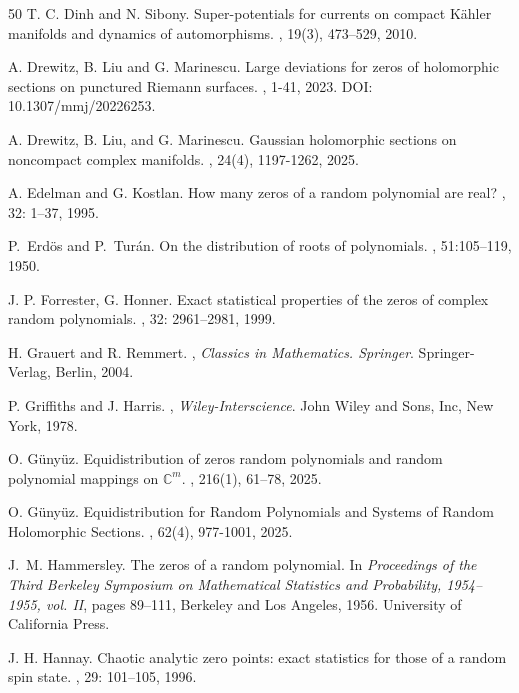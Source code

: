 \documentclass[11pt,leqno,oneside]{amsart}
\numberwithin{equation}{section}
\begin{document}
\begin{thebibliography}{50}
T. C. Dinh and N. Sibony.
\newblock Super-potentials for currents on compact K\"ahler manifolds and dynamics of automorphisms.
, 19(3), 473--529, 2010.

A. Drewitz, B. Liu and G. Marinescu.
\newblock Large deviations for zeros of holomorphic sections on punctured Riemann surfaces.
, 1-41, 2023. DOI: 10.1307/mmj/20226253.

A. Drewitz, B. Liu, and G. Marinescu.
\newblock Gaussian holomorphic sections on noncompact complex manifolds.
, 24(4), 1197-1262, 2025.

A. Edelman and G. Kostlan.
\newblock How many zeros of a random polynomial are real?
, 32: 1--37, 1995.

P.~Erd{\"o}s and P.~Tur{\'a}n.
\newblock On the distribution of roots of polynomials.
, 51:105--119, 1950.

J. P. Forrester, G. Honner.
\newblock Exact statistical properties of the zeros of complex random polynomials.
, 32: 2961–2981, 1999.

H. Grauert and R. Remmert.
, {\em Classics in Mathematics. Springer}.
\newblock Springer-Verlag, Berlin, 2004.

P. Griffiths and J. Harris.
, {\em Wiley-Interscience}.
\newblock John Wiley and Sons, Inc, New York, 1978.

O. Günyüz.
\newblock Equidistribution of zeros random polynomials and random polynomial mappings on $\mathbb{C}^m$.
, 216(1), 61–78, 2025.

O. Günyüz.
\newblock Equidistribution for Random Polynomials and Systems of Random Holomorphic Sections.
, 62(4), 977-1001, 2025.

J.~M. Hammersley.
\newblock The zeros of a random polynomial.
\newblock In {\em Proceedings of the {T}hird {B}erkeley {S}ymposium on {M}athematical {S}tatistics and {P}robability, 1954--1955, vol. {II}}, pages 89--111, Berkeley and Los Angeles, 1956. University of California Press.

J. H. Hannay.
\newblock Chaotic analytic zero points: exact statistics for those of a random spin state.
, 29: 101--105, 1996.


\end{thebibliography}
\end{document}
